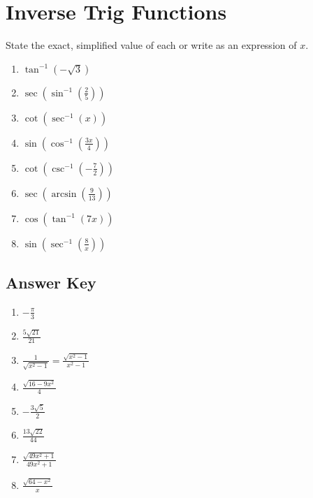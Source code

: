 \chapter{Inverse Trig Functions}

State the exact, simplified value of each or write as an expression of $x$.

\begin{enumerate}
	\item $\tan^{-1}\left(-\sqrt{3}\right)$
	\item $\sec\left(\sin^{-1}\left(\frac{2}{5}\right)\right)$
	\item $\cot\left(\sec^{-1}(x)\right)$
	\item $\sin\left(\cos^{-1}\left(\frac{3x}{4}\right)\right)$
	\item $\cot\left(\csc^{-1}\left(-\frac{7}{2}\right)\right)$
	\item $\sec\left(\arcsin\left(\frac{9}{13}\right)\right)$
	\item $\cos\left(\tan^{-1}(7x)\right)$
	\item $\sin\left(\sec^{-1}\left(\frac{8}{x}\right)\right)$
\end{enumerate}

\newpage

\section{Answer Key}

\begin{enumerate}
	\item $-\frac{\pi}{3}$
    \item $\frac{5\sqrt{21}}{21}$
    \item $\frac{1}{\sqrt{x^2-1}} = \frac{\sqrt{x^2-1}}{x^2-1}$
    \item $\frac{\sqrt{16-9x^2}}{4}$
    \item $-\frac{3\sqrt{5}}{2}$
    \item $\frac{13\sqrt{22}}{44}$
    \item $\frac{\sqrt{49x^2+1}}{49x^2+1}$
    \item $\frac{\sqrt{64-x^2}}{x}$
\end{enumerate}

